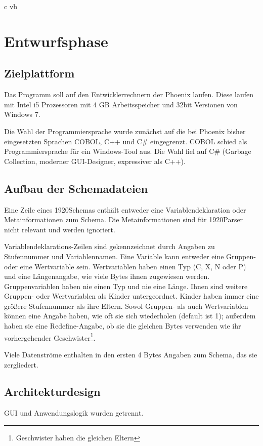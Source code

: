 c vb%
\section{Entwurfsphase} 
\label{sec:Entwurfsphase}

\subsection{Zielplattform}
\label{sec:Zielplattform}
Das Programm soll auf den Entwicklerrechnern der Phoenix laufen. Diese laufen mit  Intel i5 Prozessoren mit 4 GB Arbeitsspeicher und 32bit Versionen von Windows 7.


Die Wahl der Programmiersprache wurde zunächst auf die bei Phoenix bisher eingesetzten Sprachen COBOL, C++ und C\# eingegrenzt. COBOL schied als Programmiersprache für ein Windows-Tool aus. Die Wahl fiel auf C\# (Garbage Collection, moderner GUI-Designer, expressiver als C++).

\subsection{Aufbau der Schemadateien}
\label{sec:AufbauSchemas}
Eine Zeile eines 1920Schemas enthält entweder eine Variablendeklaration oder Metainformationen zum Schema. Die Metainformationen sind für 1920Parser nicht relevant und werden ignoriert.

Variablendeklarations-Zeilen sind gekennzeichnet durch Angaben zu Stufennummer und Variablennamen.
Eine Variable kann entweder eine Gruppen- oder eine Wertvariable sein.
Wertvariablen haben einen Typ (C, X, N oder P) und eine Längenangabe, wie viele Bytes ihnen zugewiesen werden.
Gruppenvariablen haben nie einen Typ und nie eine Länge. Ihnen sind weitere Gruppen- oder Wertvariablen als Kinder untergeordnet. Kinder haben immer eine größere Stufennummer als ihre Eltern.
Sowol Gruppen- als auch Wertvariablen können eine Angabe haben, wie oft sie sich wiederholen (default ist 1); außerdem haben sie eine Redefine-Angabe, ob sie die gleichen Bytes verwenden wie ihr vorhergehender Geschwister\footnote{Geschwister haben die gleichen Eltern}.

Viele Datenströme enthalten in den ersten 4 Bytes Angaben zum Schema, das sie zergliedert.


\subsection{Architekturdesign}
\label{sec:Architekturdesign}
GUI und Anwendungslogik wurden getrennt.


